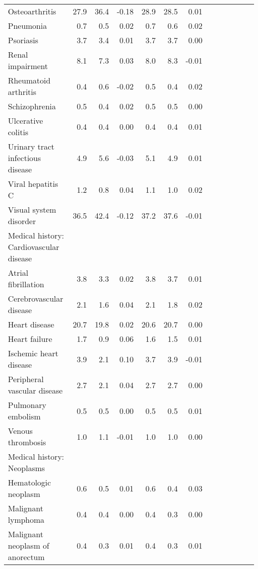 \documentclass[11pt,]{article}
\begin{document}
\begin{longtable}{lrrrrrrrrrrrr}
      Osteoarthritis & 27.9 & 36.4 & -0.18 & 28.9 & 28.5 &  0.01 \\ 
      Pneumonia &  0.7 &  0.5 &  0.02 &  0.7 &  0.6 &  0.02 \\ 
      Psoriasis &  3.7 &  3.4 &  0.01 &  3.7 &  3.7 &  0.00 \\ 
      Renal impairment &  8.1 &  7.3 &  0.03 &  8.0 &  8.3 & -0.01 \\ 
      Rheumatoid arthritis &  0.4 &  0.6 & -0.02 &  0.5 &  0.4 &  0.02 \\ 
      Schizophrenia &  0.5 &  0.4 &  0.02 &  0.5 &  0.5 &  0.00 \\ 
      Ulcerative colitis &  0.4 &  0.4 &  0.00 &  0.4 &  0.4 &  0.01 \\ 
      Urinary tract infectious disease &  4.9 &  5.6 & -0.03 &  5.1 &  4.9 &  0.01 \\ 
      Viral hepatitis C &  1.2 &  0.8 &  0.04 &  1.1 &  1.0 &  0.02 \\ 
      Visual system disorder & 36.5 & 42.4 & -0.12 & 37.2 & 37.6 & -0.01 \\ 
  Medical history: Cardiovascular disease &    &    &     &    &    &     \\ 
      Atrial fibrillation &  3.8 &  3.3 &  0.02 &  3.8 &  3.7 &  0.01 \\ 
      Cerebrovascular disease &  2.1 &  1.6 &  0.04 &  2.1 &  1.8 &  0.02 \\ 
      Heart disease & 20.7 & 19.8 &  0.02 & 20.6 & 20.7 &  0.00 \\ 
      Heart failure &  1.7 &  0.9 &  0.06 &  1.6 &  1.5 &  0.01 \\ 
      Ischemic heart disease &  3.9 &  2.1 &  0.10 &  3.7 &  3.9 & -0.01 \\ 
      Peripheral vascular disease &  2.7 &  2.1 &  0.04 &  2.7 &  2.7 &  0.00 \\ 
      Pulmonary embolism &  0.5 &  0.5 &  0.00 &  0.5 &  0.5 &  0.01 \\ 
      Venous thrombosis &  1.0 &  1.1 & -0.01 &  1.0 &  1.0 &  0.00 \\ 
  Medical history: Neoplasms &    &    &     &    &    &     \\ 
      Hematologic neoplasm &  0.6 &  0.5 &  0.01 &  0.6 &  0.4 &  0.03 \\ 
      Malignant lymphoma &  0.4 &  0.4 &  0.00 &  0.4 &  0.3 &  0.00 \\ 
      Malignant neoplasm of anorectum &  0.4 &  0.3 &  0.01 &  0.4 &  0.3 &  0.01 \\ 

\end{longtable}
\end{document}
